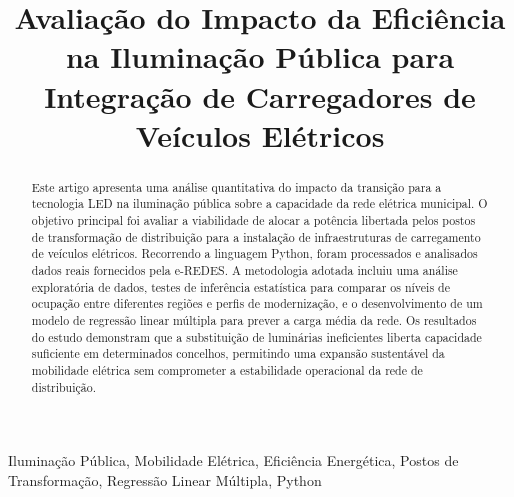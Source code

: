 \documentclass[conference]{IEEEtran}
\begin{document}
\title{Avaliação do Impacto da Eficiência na Iluminação Pública para Integração de Carregadores de Veículos Elétricos}

\author{
\and
{}
\and
{}
}

\maketitle

\begin{abstract}
Este artigo apresenta uma análise quantitativa do impacto da transição para a tecnologia LED na iluminação pública sobre a capacidade da rede elétrica municipal. O objetivo principal foi avaliar a viabilidade de alocar a potência libertada pelos postos de transformação de distribuição para a instalação de infraestruturas de carregamento de veículos elétricos. Recorrendo a linguagem Python, foram processados e analisados dados reais fornecidos pela e-REDES. A metodologia adotada incluiu uma análise exploratória de dados, testes de inferência estatística para comparar os níveis de ocupação entre diferentes regiões e perfis de modernização, e o desenvolvimento de um modelo de regressão linear múltipla para prever a carga média da rede. Os resultados do estudo demonstram que a substituição de luminárias ineficientes liberta capacidade suficiente em determinados concelhos, permitindo uma expansão sustentável da mobilidade elétrica sem comprometer a estabilidade operacional da rede de distribuição.
\end{abstract}

\begin{IEEEkeywords}
Iluminação Pública, Mobilidade Elétrica, Eficiência Energética, Postos de Transformação, Regressão Linear Múltipla, Python
\end{IEEEkeywords}
\end{document}
